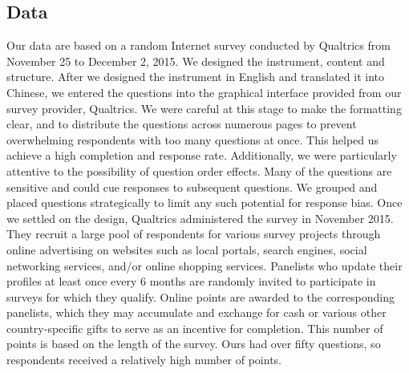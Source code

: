 \documentclass[
  letterpaper,
  DIV=11,
  numbers=noendperiod]{scrartcl}
\begin{document}
\hypertarget{data}{%
\subsection{Data}\label{data}}

Our data are based on a random Internet survey conducted by Qualtrics
from November 25 to December 2, 2015. We designed the instrument,
content and structure. After we designed the instrument in English and
translated it into Chinese, we entered the questions into the graphical
interface provided from our survey provider, Qualtrics. We were careful
at this stage to make the formatting clear, and to distribute the
questions across numerous pages to prevent overwhelming respondents with
too many questions at once. This helped us achieve a high completion and
response rate. Additionally, we were particularly attentive to the
possibility of question order effects. Many of the questions are
sensitive and could cue responses to subsequent questions. We grouped
and placed questions strategically to limit any such potential for
response bias. Once we settled on the design, Qualtrics administered the
survey in November 2015. They recruit a large pool of respondents for
various survey projects through online advertising on websites such as
local portals, search engines, social networking services, and/or online
shopping services. Panelists who update their profiles at least once
every 6 months are randomly invited to participate in surveys for which
they qualify. Online points are awarded to the corresponding panelists,
which they may accumulate and exchange for cash or various other
country-specific gifts to serve as an incentive for completion. This
number of points is based on the length of the survey. Ours had over
fifty questions, so respondents received a relatively high number of
points.
\end{document}
